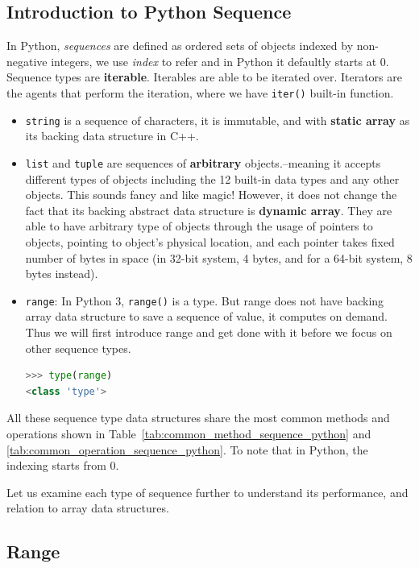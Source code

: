 \documentclass[../main.tex]{subfiles}
\begin{document}
\subsection{Introduction to Python Sequence}
In Python, \textit{sequences} are defined as ordered sets of objects indexed by non-negative integers, we use \textit{index} to refer and in Python it defaultly starts at $0$. Sequence types are \textbf{iterable}. Iterables are able to be iterated over. Iterators are the agents that perform the iteration, where we have \texttt{iter()} built-in function. 
\begin{itemize}
    \item \texttt{string} is  a sequence of characters, it is immutable, and with \textbf{static array} as its backing data structure in C++. 
    \item \texttt{list} and \texttt{tuple} are sequences of \textbf{arbitrary} objects.--meaning it accepts different types of objects including the 12 built-in data types and any other objects. This sounds fancy and like magic! However, it does not change the fact that its backing abstract data structure is \textbf{dynamic array}. They are able to have arbitrary type of objects through the usage of pointers to objects, pointing to object's physical location, and each pointer takes fixed number of bytes in space (in 32-bit system, 4 bytes, and for a 64-bit system, 8 bytes instead). 
    \item \texttt{range}: In Python 3, \texttt{range()} is a type. But range does not have backing array data structure to save a sequence of value, it computes on demand. Thus we will first introduce range and get done with it before we focus on other sequence types. 
\begin{lstlisting}[language=Python]
>>> type(range)
<class 'type'>
\end{lstlisting}
    \end{itemize}

All these sequence type data structures share the most common methods and operations shown in Table~\ref{tab:common_method_sequence_python} and \ref{tab:common_operation_sequence_python}. To note that in Python, the indexing starts from 0. 

Let us examine each type of sequence further to understand its performance, and relation to array data structures. 
\subsection{Range}
\end{document}
